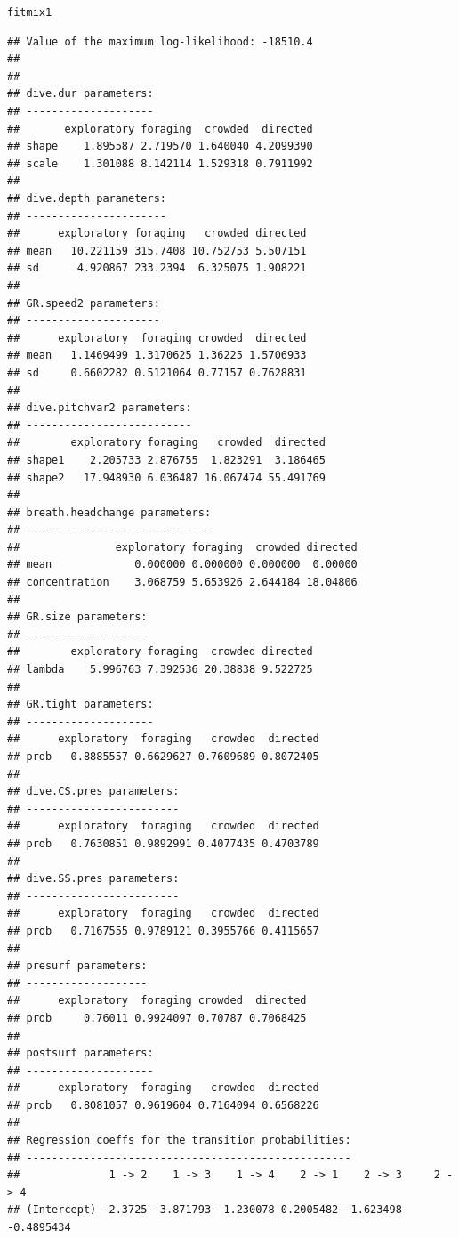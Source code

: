 \documentclass[12pt]{article}\usepackage[]{graphicx}\usepackage[]{xcolor}
\makeatletter
\newcommand{\hldef}[1]{\textcolor[rgb]{0.345,0.345,0.345}{#1}}%
\newenvironment{kframe}{%
 \def\at@end@of@kframe{}%
 \ifinner\ifhmode%
  \def\at@end@of@kframe{\end{minipage}}%
  \begin{minipage}{\columnwidth}%
 \fi\fi%
 \def\FrameCommand##1{\hskip\@totalleftmargin \hskip-\fboxsep
 \colorbox{shadecolor}{##1}\hskip-\fboxsep
     \hskip-\linewidth \hskip-\@totalleftmargin \hskip\columnwidth}%
 \MakeFramed {\advance\hsize-\width
   \@totalleftmargin\z@ \linewidth\hsize
   \@setminipage}}%
 {\par\unskip\endMakeFramed%
 \at@end@of@kframe}
\newenvironment{knitrout}{}{} %
\makeatother
\begin{document}
\begin{knitrout}
\color{fgcolor}\begin{kframe}
\begin{alltt}
\hldef{fitmix1}
\end{alltt}
\begin{verbatim}
## Value of the maximum log-likelihood: -18510.4 
## 
## 
## dive.dur parameters:
## --------------------
##       exploratory foraging  crowded  directed
## shape    1.895587 2.719570 1.640040 4.2099390
## scale    1.301088 8.142114 1.529318 0.7911992
## 
## dive.depth parameters:
## ----------------------
##      exploratory foraging   crowded directed
## mean   10.221159 315.7408 10.752753 5.507151
## sd      4.920867 233.2394  6.325075 1.908221
## 
## GR.speed2 parameters:
## ---------------------
##      exploratory  foraging crowded  directed
## mean   1.1469499 1.3170625 1.36225 1.5706933
## sd     0.6602282 0.5121064 0.77157 0.7628831
## 
## dive.pitchvar2 parameters:
## --------------------------
##        exploratory foraging   crowded  directed
## shape1    2.205733 2.876755  1.823291  3.186465
## shape2   17.948930 6.036487 16.067474 55.491769
## 
## breath.headchange parameters:
## -----------------------------
##               exploratory foraging  crowded directed
## mean             0.000000 0.000000 0.000000  0.00000
## concentration    3.068759 5.653926 2.644184 18.04806
## 
## GR.size parameters:
## -------------------
##        exploratory foraging  crowded directed
## lambda    5.996763 7.392536 20.38838 9.522725
## 
## GR.tight parameters:
## --------------------
##      exploratory  foraging   crowded  directed
## prob   0.8885557 0.6629627 0.7609689 0.8072405
## 
## dive.CS.pres parameters:
## ------------------------
##      exploratory  foraging   crowded  directed
## prob   0.7630851 0.9892991 0.4077435 0.4703789
## 
## dive.SS.pres parameters:
## ------------------------
##      exploratory  foraging   crowded  directed
## prob   0.7167555 0.9789121 0.3955766 0.4115657
## 
## presurf parameters:
## -------------------
##      exploratory  foraging crowded  directed
## prob     0.76011 0.9924097 0.70787 0.7068425
## 
## postsurf parameters:
## --------------------
##      exploratory  foraging   crowded  directed
## prob   0.8081057 0.9619604 0.7164094 0.6568226
## 
## Regression coeffs for the transition probabilities:
## ---------------------------------------------------
##              1 -> 2    1 -> 3    1 -> 4    2 -> 1    2 -> 3     2 -> 4
## (Intercept) -2.3725 -3.871793 -1.230078 0.2005482 -1.623498 -0.4895434

\end{verbatim}
\end{kframe}
\end{knitrout}
\end{document}
